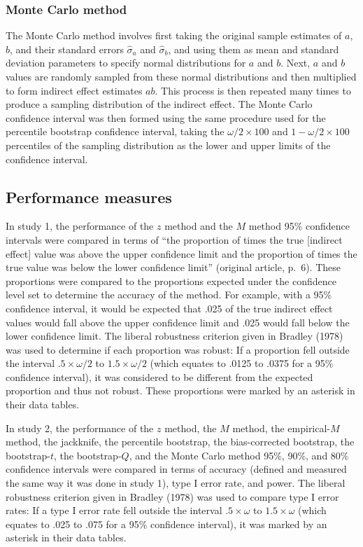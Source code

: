 \documentclass[10,a4paperpaper,]{article}
\begin{document}
\subsubsection{Monte Carlo method}

The Monte Carlo method involves first taking the original sample
estimates of \(a\), \(b\), and their standard errors \(\hat{\sigma}_a\)
and \(\hat{\sigma}_b\), and using them as mean and standard deviation
parameters to specify normal distributions for \(a\) and \(b\). Next,
\(a\) and \(b\) values are randomly sampled from these normal
distributions and then multiplied to form indirect effect estimates
\(ab\). This process is then repeated many times to produce a sampling
distribution of the indirect effect. The Monte Carlo confidence interval
was then formed using the same procedure used for the percentile
bootstrap confidence interval, taking the \(\omega/2 \times 100\) and
\(1- \omega/2 \times 100\) percentiles of the sampling distribution as
the lower and upper limits of the confidence interval.

\subsection{Performance measures}

In study 1, the performance of the \(z\) method and the \(M\) method
95\% confidence intervals were compared in terms of ``the proportion of
times the true {[}indirect effect{]} value was above the upper
confidence limit and the proportion of times the true value was below
the lower confidence limit'' (original article, p.~6). These proportions
were compared to the proportions expected under the confidence level set
to determine the accuracy of the method. For example, with a 95\%
confidence interval, it would be expected that .025 of the true indirect
effect values would fall above the upper confidence limit and .025 would
fall below the lower confidence limit. The liberal robustness criterion
given in Bradley (1978) was used to determine if each proportion was
robust: If a proportion fell outside the interval \(.5 \times \omega/2\)
to \(1.5 \times \omega/2\) (which equates to .0125 to .0375 for a 95\%
confidence interval), it was considered to be different from the
expected proportion and thus not robust. These proportions were marked
by an asterisk in their data tables.

In study 2, the performance of the \(z\) method, the \(M\) method, the
empirical-\(M\) method, the jackknife, the percentile bootstrap, the
bias-corrected bootstrap, the bootstrap-\(t\), the bootstrap-\(Q\), and
the Monte Carlo method 95\%, 90\%, and 80\% confidence intervals were
compared in terms of accuracy (defined and measured the same way it was
done in study 1), type I error rate, and power. The liberal robustness
criterion given in Bradley (1978) was used to compare type I error
rates: If a type I error rate fell outside the interval
\(.5 \times \omega\) to \(1.5 \times \omega\) (which equates to .025 to
.075 for a 95\% confidence interval), it was marked by an asterisk in
their data tables.
\end{document}
